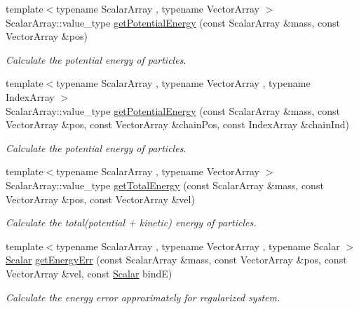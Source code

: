 \begin{DoxyCompactItemize}
{\footnotesize template$<$typename Scalar\+Array , typename Vector\+Array $>$ }\\Scalar\+Array\+::value\+\_\+type \mbox{\hyperlink{namespace_space_h_aecd56c4b16c8c9e47d4083c52db1640a}{get\+Potential\+Energy}} (const Scalar\+Array \&mass, const Vector\+Array \&pos)
\begin{DoxyCompactList}\small\item\em Calculate the potential energy of particles. \end{DoxyCompactList}\item 
{\footnotesize template$<$typename Scalar\+Array , typename Vector\+Array , typename Index\+Array $>$ }\\Scalar\+Array\+::value\+\_\+type \mbox{\hyperlink{namespace_space_h_a8796203b0c912b1137302096c8539cda}{get\+Potential\+Energy}} (const Scalar\+Array \&mass, const Vector\+Array \&pos, const Vector\+Array \&chain\+Pos, const Index\+Array \&chain\+Ind)
\begin{DoxyCompactList}\small\item\em Calculate the potential energy of particles. \end{DoxyCompactList}\item 
{\footnotesize template$<$typename Scalar\+Array , typename Vector\+Array $>$ }\\Scalar\+Array\+::value\+\_\+type \mbox{\hyperlink{namespace_space_h_aad574495853114033bac0925f29ced20}{get\+Total\+Energy}} (const Scalar\+Array \&mass, const Vector\+Array \&pos, const Vector\+Array \&vel)
\begin{DoxyCompactList}\small\item\em Calculate the total(potential + kinetic) energy of particles. \end{DoxyCompactList}\item 
{\footnotesize template$<$typename Scalar\+Array , typename Vector\+Array , typename Scalar $>$ }\\\mbox{\hyperlink{create_kepler_8cpp_a8c2981f3f834be9448a6ab06c28748eb}{Scalar}} \mbox{\hyperlink{namespace_space_h_af674a32e51a168974fbb76585ba803d9}{get\+Energy\+Err}} (const Scalar\+Array \&mass, const Vector\+Array \&pos, const Vector\+Array \&vel, const \mbox{\hyperlink{create_kepler_8cpp_a8c2981f3f834be9448a6ab06c28748eb}{Scalar}} bindE)
\begin{DoxyCompactList}\small\item\em Calculate the energy error approximately for regularized system. \end{DoxyCompactList}\item 

\end{DoxyCompactItemize}

